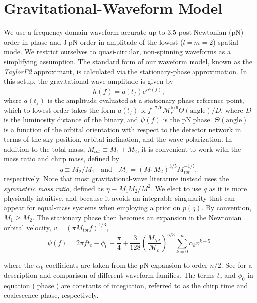 \documentclass[11pt,a4paper]{emulateapj} 
\newcommand{\chmass}{\mathcal{M}_c}
\begin{document}
\section{Gravitational-Waveform Model}
\label{appendixWaveform}

We use a frequency-domain waveform accurate up to $3.5$ post-Newtonian
(pN) order in phase and 3 pN order in amplitude of the lowest ($l=m=2$) spatial mode.
  We restrict
ourselves to quasi-circular, non-spinning waveforms as a simplifying
assumption.  The standard form of our waveform model, known as the
\textit{TaylorF2} approximant, is calculated via the stationary-phase
approximation.  In this setup, the gravitational-wave amplitude is
given by
\begin{equation}
\tilde{h}(f) = a(t_f) e^{i \psi(f)},
\label{amplitude}
\end{equation}
where $a(t_f)$ is the amplitude evaluated at a stationary-phase
reference point, which to lowest order takes the form $a(t_f) \propto
f^{-7/6} \chmass^{5/6}\Theta(\text{angle})/D$, where $D$ is the
luminosity distance of the binary, and $\psi(f)$ is the pN phase.
$\Theta(\text{angle})$ is a function of the orbital orientation with
respect to the detector network in terms of the sky position, orbital
inclination, and the wave polarization.  In addition to the total
mass, $M_{tot}\equiv M_1+M_2$, it is convenient to work with the mass
ratio and chirp mass, defined by
\begin{equation}
  q\equiv M_2/M_1~~~~\text{and}~~~~\chmass = (M_1 M_2)^{3/5}
  M_{tot}^{-1/5},
  \label{eqRatioCM}
\end{equation}
respectively.  Note that most gravitational-wave literature instead uses
  the \textit{symmetric mass ratio}, defined as $\eta \equiv M_1 M_2 /
  M^2$.  We elect to use $q$ as it is more physically intuitive, and
  because it avoids an integrable singularity that can appear for
  equal-mass systems when employing a prior on $p(\eta)$.  
     By convention, $M_1 \geq M_2$.  The stationary phase then
becomes an expansion in the Newtonian orbital velocity, $v=(\pi
M_{tot} f)^{1/3}$,
\begin{equation}
\psi(f) = 2 \pi f t_c - \phi_0 + \frac{\pi}{4} +
\frac{3}{128}\left(\frac{M_{tot}}{\chmass}\right)^{5/3}\sum^{n}_{k=0}\alpha_{k}v^{k-5}
\label{phase}
\end{equation}

\noindent where the $\alpha_{k}$ coefficients are taken from the pN
expansion to order $n/2$.  See \cite{BuonannoWaveform} for a
description and comparison of different waveform families.  The terms
$t_c$ and $\phi_0$ in equation (\ref{phase}) are constants of
integration, referred to as the chirp time and coalescence phase,
respectively.
\end{document}
